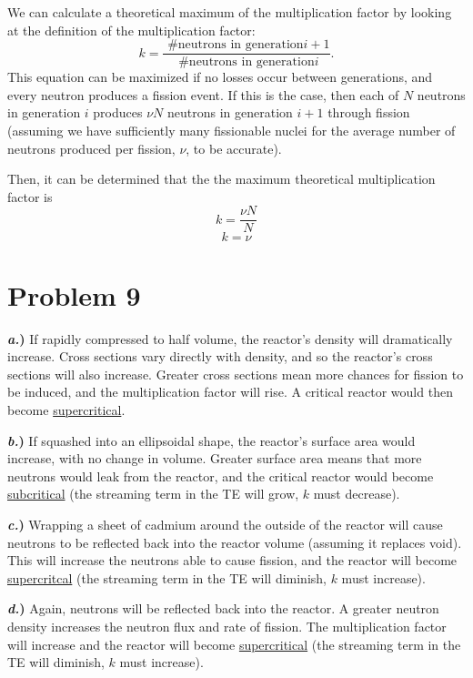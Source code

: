 \documentclass{article}
\begin{document}
We can calculate a theoretical maximum of the multiplication factor by looking at the definition of the multiplication factor:
$$ k = \frac{\text{ \# neutrons in generation}i+1}{\text{ \# neutrons in generation} i}. $$
This equation can be maximized if no losses occur between generations, and every neutron produces a fission event. If this is the case, then each of $N$ neutrons in generation $i$ produces $\nu N$ neutrons in generation $i+1$ through fission (assuming we have sufficiently many fissionable nuclei for the average number of neutrons produced per fission, $\nu$, to be accurate).

Then, it can be determined that the the maximum theoretical multiplication factor is 
$$ k = \frac{\nu N}{N} $$
$$\boxed{ k = \nu }$$




\section*{Problem 9}

\textbf{\textit{a.})} If rapidly compressed to half volume, the reactor's density will dramatically increase. Cross sections vary directly with density, and so the reactor's cross sections will also increase. Greater cross sections mean more chances for fission to be induced, and the multiplication factor will rise. A critical reactor would then become \underline{supercritical}.

\textbf{\textit{b.})} If squashed into an ellipsoidal shape, the reactor's surface area would increase, with no change in volume. Greater surface area means that more neutrons would leak from the reactor, and the critical reactor would become \underline{subcritical} (the streaming term in the TE will grow, $k$ must decrease).

\textbf{\textit{c.})} Wrapping a sheet of cadmium around the outside of the reactor will cause neutrons to be reflected back into the reactor volume (assuming it replaces void). This will increase the neutrons able to cause fission, and the reactor will become \underline{supercritcal}  (the streaming term in the TE will diminish, $k$ must increase).

\textbf{\textit{d.})} Again, neutrons will be reflected back into the reactor. A greater neutron density increases the neutron flux and rate of fission. The multiplication factor will increase and the reactor will become \underline{supercritical}  (the streaming term in the TE will diminish, $k$ must increase).
\end{document}
